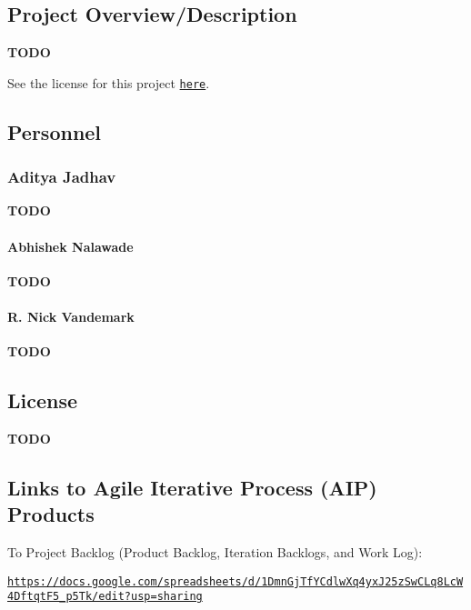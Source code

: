 \href{https://app.travis-ci.com/rnvandemark/enpm808x_final_inspection_robot}{\tt } \href{https://coveralls.io/github/rnvandemark/enpm808x_final_inspection_robot?branch=master}{\tt }

\subsection*{Project Overview/\+Description}

{\bfseries T\+O\+DO}

See the license for this project \href{LICENSE.txt}{\tt here}.

\subsection*{Personnel}

\subsubsection*{Aditya Jadhav}

{\bfseries T\+O\+DO}

\paragraph*{Abhishek Nalawade}

{\bfseries T\+O\+DO}

\paragraph*{R. Nick Vandemark}

{\bfseries T\+O\+DO}

\subsection*{License}

{\bfseries T\+O\+DO}

\subsection*{Links to Agile Iterative Process (A\+IP) Products}

To Project Backlog (Product Backlog, Iteration Backlogs, and Work Log)\+:

\href{https://docs.google.com/spreadsheets/d/1DmnGjTfYCdlwXq4yxJ25zSwCLq8LcW4DftqtF5_p5Tk/edit?usp=sharing}{\tt https\+://docs.\+google.\+com/spreadsheets/d/1\+Dmn\+Gj\+Tf\+Y\+Cdlw\+Xq4yx\+J25z\+Sw\+C\+Lq8\+Lc\+W4\+Dftqt\+F5\+\_\+p5\+Tk/edit?usp=sharing}

